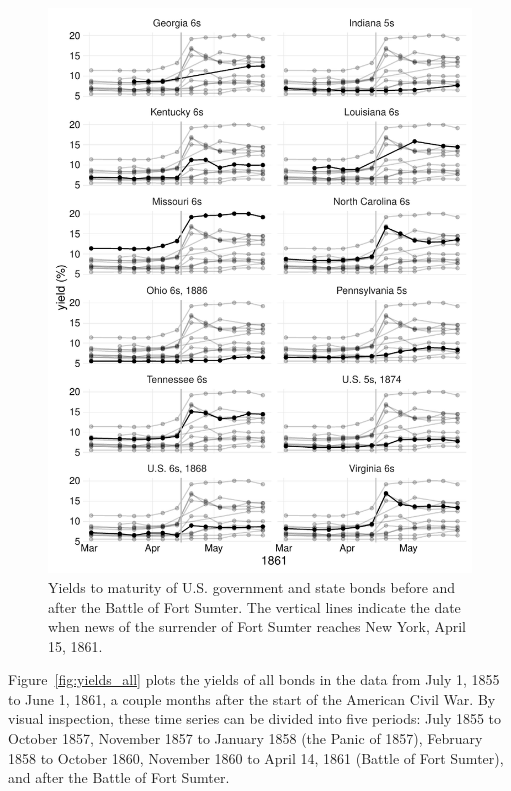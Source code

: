 \documentclass[]{article}\usepackage[]{graphicx}\usepackage[]{color}
\begin{document}
\begin{figure}
  \centering
  \includegraphics[width=\textwidth]{./figures/fig_yields_sumter-1}
\caption[Yields to maturity of U.S. government and state bonds before and after the Battle of Fort Sumter.]{
  Yields to maturity of U.S. government and state bonds before and after the Battle of Fort Sumter.
  The vertical lines indicate the date when news of the surrender of Fort Sumter reaches New York, April 15, 1861.
}
\label{fig:yields_sumter}
\end{figure}

Figure~\ref{fig:yields_all} plots the yields of all bonds in the data from July  1, 1855 to June  1, 1861, a couple months after the start of the American Civil War.
By visual inspection, these time series can be divided into five periods:
July 1855 to October 1857,
November 1857 to January 1858 (the Panic of 1857),
February 1858 to October 1860,
November 1860 to April 14, 1861 (Battle of Fort Sumter),
and after the Battle of Fort Sumter.
\end{document}
